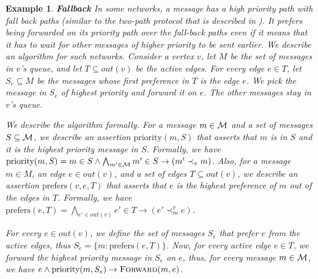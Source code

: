 \documentclass[11pt,eepic]{article}
\newcommand{\set}[1]{\{ #1  \}}
\newcommand{\M}{{\cal M}}
\newcommand{\Forw}{\mbox{\sc Forward}}
\newtheorem{exmpl}[theorem]{Example}
\newenvironment{example}{\begin{exmpl}\rm}{\hspace{\stretch{1}}\end{exmpl}}
\begin{document}
	\begin{example} {\bf Fallback}
	\label{ex:fallback}
		In some networks, a message has a high priority path with fall back paths (similar to the two-path protocol that is described in \cite{emsoft}). It prefers being forwarded on its priority path over the fall-back paths even if it means that it has to wait for other messages of higher priority to be sent earlier. We describe an algorithm for such networks. Consider a vertex $v$, let $M$ be the set of messages in $v$'s queue, and let $T \subseteq out(v)$ be the active edges. For every edge $e \in T$, let $S_e \subseteq M$ be the messages whose first preference in $T$ is the edge $e$. We pick the message in $S_e$ of highest priority and forward it on $e$. The other messages stay in $v$'s queue.

		We describe the algorithm formally. For a message $m \in \M$ and a set of messages $S \subseteq \M$, we describe an assertion $\mbox{priority}(m, S)$ that asserts that $m$ is in $S$ and it is the highest priority message in $S$. Formally, we have $\mbox{priority}(m, S) = m\in S \wedge \bigwedge_{m' \in \M} m' \in S \rightarrow (m' \prec_v m)$. Also, for a message $m \in M$, an edge $e \in out(v)$, and a set of edges $T \subseteq out(v)$, we describe an assertion $\mbox{prefers}(v, e, T)$ that asserts that $e$ is the highest preference of $m$ out of the edges in $T$. Formally, we have $\mbox{prefers}(e, T) = \bigwedge_{e' \in out(v)} e' \in T \rightarrow (e' \prec_m^v e)$. 

		For every $e \in out(v)$, we define the set of messages $S_e$ that prefer $e$ from the active edges, thus $S_e = \set{m :  \mbox{prefers}(e, T)}$. Now, for every active edge $e \in T$, we forward the highest priority message in $S_e$ on $e$, thus, for every message $m \in \M$, we have $e \wedge \mbox{priority}(m, S_e) \rightarrow \Forw(m, e)$.
		\end{example}
\end{document}
